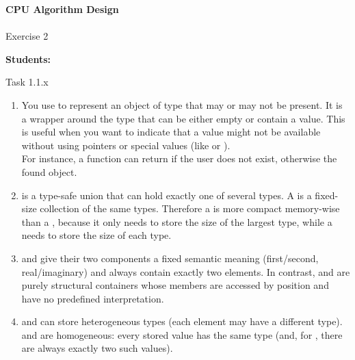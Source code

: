 





\begin{Large}
    \textsf{\textbf{CPU Algorithm Design}} \\
    \\
    Exercise 2
\end{Large}
\vspace{1ex}
\textsf{\textbf{Students:}}  \\
\vspace{2ex}

\begin{problem}{}{Task 1.1.x}
    \begin{enumerate}[(1)]
        \item 
            You use  to represent an object of type  that may or may not be present. 
            It is a wrapper around the type  that can be either empty or contain a value. 
            This is useful when you want to indicate that a value might not be available without using pointers or special 
            values (like  or ). \\
            For instance, a  function can return 
            if the user does not exist, otherwise the found  object.
        \item 
             is a type-safe union that can hold exactly one of several types. 
            A  is a fixed-size collection of the same types.
            Therefore a  is more compact memory-wise than a , 
            because it only needs to store the size of the largest type, while a  
            needs to store the size of each type.
        \item  
             and  give their two
            components a fixed semantic meaning (first/second,
            real/imaginary) and always contain exactly two elements.  
            In contrast,  and  are
            purely structural containers whose members are accessed by
            position and have no predefined interpretation.

        \item  
             and  can store
            heterogeneous types (each element may have a different
            type).  
             and 
            are homogeneous: every stored value has the same type
             (and, for , there are always
            exactly two such values).


\end{enumerate}
\end{problem}

